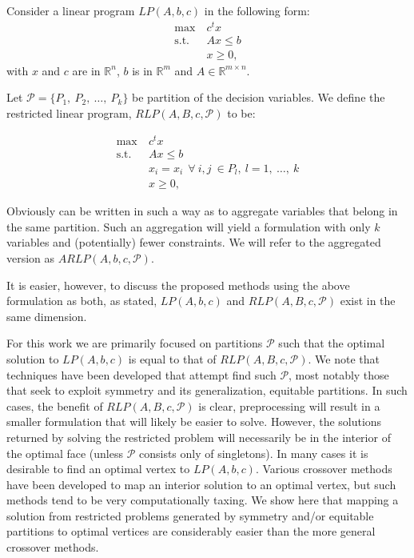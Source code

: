 \documentclass[runningheads]{llncs}
\newcommand{\cP}{{\mathcal P}}
\begin{document}




Consider a linear program $LP(A,b,c)$ in the following form:
\begin{align} \label{eq:LP}
  \max \ & c^t x \\
  \mbox{s.t. } & Ax \leq b\\
  & x \geq 0,
  \end{align}
\noindent with  $x$ and  $c$ are in $\mathbb{R}^n$, $b$ is in $\mathbb{R}^m$ and
$A \in \mathbb{R}^{m \times n}$.

Let $\cP = \{P_1,\ P_2,\ \ldots,\ P_k\}$ be partition of the decision variables. We define the restricted
linear program, $RLP(A,B,c,\cP)$ to be:

\begin{align}
  \max \ & c^t x \\
  \mbox{s.t. } & Ax \leq b\\
  & x_i = x_i \ \ \forall\ i,j \ \in P_l,\  l= 1,\ \ldots,\ k \label{cons:equal}\\
  & x \geq 0,
  \end{align}

\noindent Obviously can be written in such a way as to aggregate variables that
belong in the same partition. Such an aggregation will yield a formulation with
only $k$ variables and (potentially) fewer constraints. We will refer to the aggregated version as $ARLP(A,b,c,\cP)$.

 It is easier, however, to
discuss the proposed methods using the above formulation as both, as stated,  $LP(A,b,c)$ and
$RLP(A,B,c,\cP)$ exist in the same dimension.

For this work we are primarily focused on partitions $\cP$ such that the optimal
solution to $LP(A,b,c)$ is equal to that of $RLP(A,B,c,\cP)$. We note that
techniques have been developed that attempt find such $\cP$, most notably those
that seek to exploit symmetry and its generalization, equitable partitions. In
such cases, the benefit of  $RLP(A,B,c,\cP)$ is clear, preprocessing will result
in a smaller formulation that will likely be easier to solve. However, the
solutions returned by solving the restricted problem will necessarily be in the
interior of the optimal face (unless $\cP$ consists only of singletons). In many
cases it is desirable to find an optimal vertex to $LP(A,b,c)$. Various
crossover methods have been developed to map an interior solution to an optimal
vertex, but such methods tend to be very computationally taxing. We show here
that mapping a solution from restricted problems generated by symmetry and/or
equitable partitions to optimal vertices are
considerably easier than the more general crossover methods.
\end{document}
